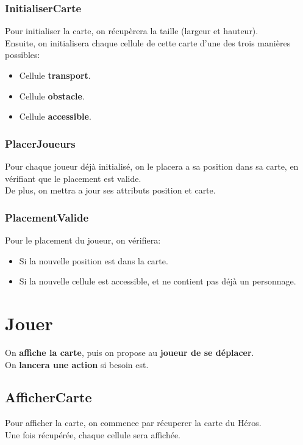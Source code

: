             \subsubsection{InitialiserCarte}
                Pour initialiser la carte, on récupèrera la taille (largeur et hauteur).\\
                Ensuite, on initialisera chaque cellule de cette carte d'une des trois manières possibles:
                \begin{itemize}
                    \item Cellule \textbf{transport}.
                    \item Cellule \textbf{obstacle}.
                    \item Cellule \textbf{accessible}.
                \end{itemize}
            \subsubsection{PlacerJoueurs}
                Pour chaque joueur déjà initialisé, on le placera a sa position dans sa carte, en vérifiant que le placement est valide.\\
                De plus, on mettra a jour ses attributs position et carte.
                \subsubsection{PlacementValide}
                    Pour le placement du joueur, on vérifiera:
                    \begin{itemize}
                        \item Si la nouvelle position est dans la carte.
                        \item Si la nouvelle cellule est accessible, et ne contient pas déjà un personnage.
                    \end{itemize}
    \section{Jouer}
        On \textbf{affiche la carte}, puis on propose au \textbf{joueur de se déplacer}.\\
        On \textbf{lancera une action} si besoin est.
        \subsection{AfficherCarte}
            Pour afficher la carte, on commence par récuperer la carte du Héros.\\
            Une fois récupérée, chaque cellule sera affichée.
